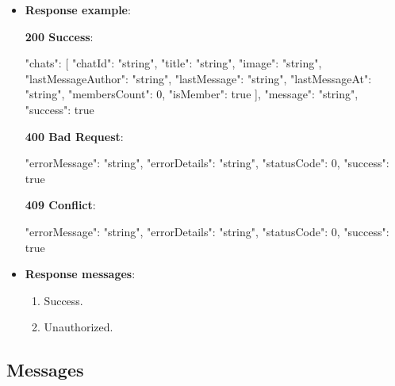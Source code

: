 \begin{itemize}
\begin{itemize}
        \item \textbf{Response example}:

        \textbf{200 Success}:

        \begin{spverbatim}
        {
            "chats": [
                {
                "chatId": "string",
                "title": "string",
                "image": "string",
                "lastMessageAuthor": "string",
                "lastMessage": "string",
                "lastMessageAt": "string",
                "membersCount": 0,
                "isMember": true
            }
            ],
            "message": "string",
            "success": true
        }
        \end{spverbatim}

        \textbf{400 Bad Request}:

        \begin{spverbatim}
        {
            "errorMessage": "string",
            "errorDetails": "string",
            "statusCode": 0,
            "success": true
        }
        \end{spverbatim}

        \textbf{409 Conflict}:

        \begin{spverbatim}
        {
            "errorMessage": "string",
            "errorDetails": "string",
            "statusCode": 0,
            "success": true
        }
        \end{spverbatim}

        \item \textbf{Response messages}:
        \begin{enumerate}
            \item Success.
            \item Unauthorized.
        \end{enumerate}
    \end{itemize}

\end{itemize}

\subsection{Messages}\label{subsec: messages}

